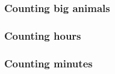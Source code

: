 \documentclass[../nihongo-gakushuu-kyouzai.tex]{subfiles}
\begin{document}
\begin{multicols}{2}
\subsubsection{Counting big animals}
\begin{center}
\label{tbl:appendix-vocab-nouns-counting-big-animals}
\end{center}



\subsubsection{Counting hours}
\begin{center}
\label{tbl:appendix-vocab-nouns-counting-hours}
\end{center}


\subsubsection{Counting minutes}
\begin{center}
\label{tbl:appendix-vocab-nouns-counting-minutes}
\end{center}



\end{multicols}
\end{document}
